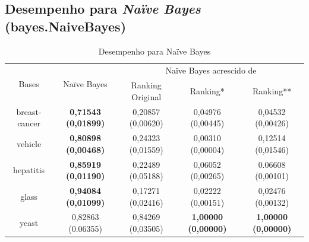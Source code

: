 \clearpage
\pagebreak


\subsection{Desempenho para \emph{Naïve Bayes} (bayes.NaiveBayes)}

\begin{table}[h!]
    \begin{tabular}{ c c c c c }
        \hline

        \multirow{2}{*}{Bases} & \multirow{2}{*}{Naïve Bayes} & \multicolumn{3}{c}{Naïve Bayes acrescido de} \\ \cline{3-5}
        & & {\small Ranking Original} & {\small Ranking*} & {\small  Ranking**} \\
    
        \hline
        
        breast-cancer & {\small \textbf{0,71543 (0,01899)}} & {\small 0,20857 (0,00620)} & {\small 0,04976 (0,00445)} & {\small 0,04532 (0,00426)} \\
        vehicle & {\small \textbf{0,80898 (0,00468)}} & {\small 0,24323 (0,01559)} & {\small 0,00310 (0,00004)} & {\small 0,12514 (0,01546)} \\
        hepatitis & {\small \textbf{0,85919 (0,01190)}} & {\small 0,22489 (0,05188)} & {\small 0,06052 (0,00265)} & {\small 0.06608 (0,00101)} \\
        glass & {\small \textbf{0,94084 (0,01099)}} & {\small 0,17271 (0,02416)} & {\small 0,02222 (0,00151)} & {\small 0,02476 (0,00132)} \\
        yeast & {\small 0,82863 (0.06355)} & {\small 0,84269 (0,03505)} & {\small \textbf{1,00000 (0,00000)}} & {\small \textbf{1,00000 (0,00000)}} \\
    
        \hline
    \end{tabular}
    
    \caption{Desempenho para Naïve Bayes}
    \label{nb_results_table}
\end{table}


